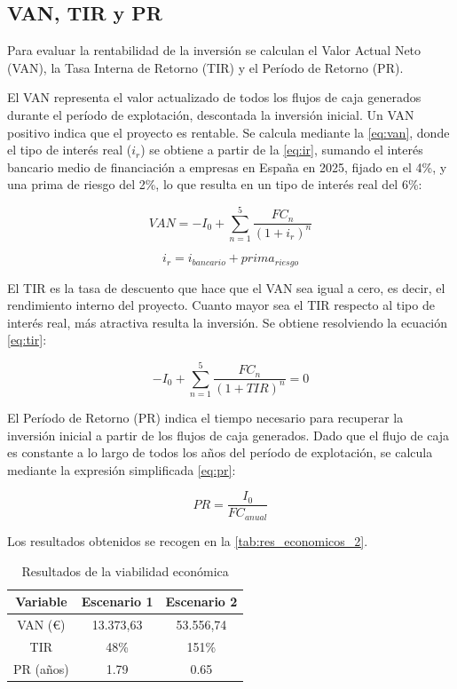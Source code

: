 \documentclass[../main.tex]{subfiles}
\begin{document}
\subsection{VAN, TIR y PR}

Para evaluar la rentabilidad de la inversión se calculan el Valor Actual Neto (VAN), la Tasa Interna de Retorno (TIR) y el Período de Retorno (PR).

El VAN representa el valor actualizado de todos los flujos de caja generados durante el período de explotación, descontada la inversión inicial. Un VAN positivo indica que el proyecto es rentable. Se calcula mediante la \ref{eq:van}, donde el tipo de interés real ($i_{r}$) se obtiene a partir de la \ref{eq:ir}, sumando el interés bancario medio de financiación a empresas en España en 2025, fijado en el 4\%, y una prima de riesgo del 2\%, lo que resulta en un tipo de interés real del 6\%:

\begin{equation}
    VAN = -I_{0} + \sum_{n=1}^{5} \frac{FC_{n}}{(1 + i_{r})^{n}}
    \label{eq:van}
\end{equation}

\begin{equation}
    i_{r} = i_{bancario} + prima_{riesgo}
    \label{eq:ir}
\end{equation}

El TIR es la tasa de descuento que hace que el VAN sea igual a cero, es decir, el rendimiento interno del proyecto. Cuanto mayor sea el TIR respecto al tipo de interés real, más atractiva resulta la inversión. Se obtiene resolviendo la ecuación \ref{eq:tir}:

\begin{equation}
    -I_{0} + \sum_{n=1}^{5} \frac{FC_{n}}{(1 + TIR)^{n}} = 0
    \label{eq:tir}
\end{equation}

El Período de Retorno (PR) indica el tiempo necesario para recuperar la inversión inicial a partir de los flujos de caja generados. Dado que el flujo de caja es constante a lo largo de todos los años del período de explotación, se calcula mediante la expresión simplificada \ref{eq:pr}:

\begin{equation}
    PR = \frac{I_{0}}{FC_{anual}}
    \label{eq:pr}
\end{equation}

Los resultados obtenidos se recogen en la \autoref{tab:res_economicos_2}.

\begin{table}[ht]
\centering
\begin{tabular}{|c|c|c|}
\hline
\textbf{Variable} & \textbf{Escenario 1} & \textbf{Escenario 2} \\ \hline
VAN (€) & 13.373,63 & 53.556,74 \\ \hline
TIR & 48\% & 151\% \\ \hline
PR (años) & 1.79 & 0.65 \\ \hline
\end{tabular}
\caption{Resultados de la viabilidad económica}
\label{tab:res_economicos_2}
\end{table}
\end{document}
